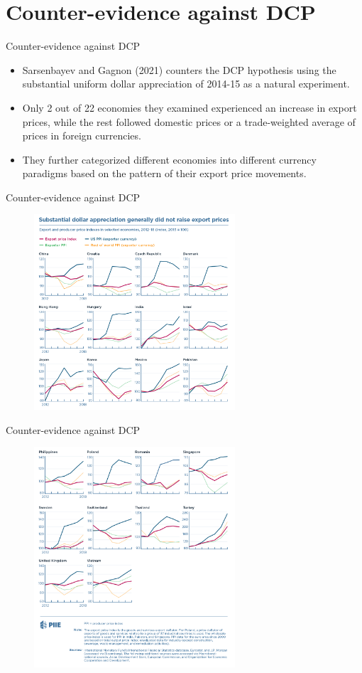 \documentclass{beamer}
\begin{document}
\section{Counter-evidence against DCP}
\begin{frame}{Counter-evidence against DCP}
\begin{itemize}
    \item Sarsenbayev and Gagnon (2021) counters the DCP hypothesis using the substantial uniform dollar appreciation of 2014-15 as a natural experiment.
    \item Only 2 out of 22 economies they examined experienced an increase in export prices, while the rest followed domestic prices or a trade-weighted average of prices in foreign currencies.
    \item They further categorized different economies into different currency paradigms based on the pattern of their export price movements.
\end{itemize}
\end{frame}
\begin{frame}{Counter-evidence against DCP}
    \begin{figure}[htp]
        \centering
        \includegraphics[width=7.5cm]{22countries.png}
    \end{figure}
\end{frame}
\begin{frame}{Counter-evidence against DCP}
    \begin{figure}[htp]
        \centering
        \includegraphics[width=7.5cm]{22countries copy.png}
    \end{figure}
\end{frame}
\end{document}
